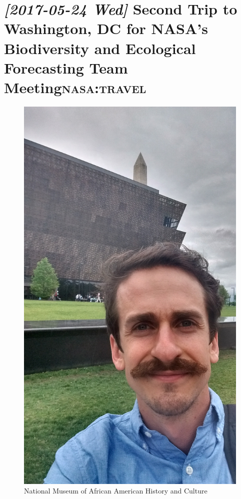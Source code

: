 \documentclass{article}
\begin{document}
\section*{\textit{[2017-05-24 Wed] } Second Trip to Washington, DC for NASA's Biodiversity and Ecological Forecasting Team Meeting\hfill{}\textsc{nasa:travel}}
\label{sec:org2332ca0}
\begin{figure}[htbp]
\centering
\includegraphics[width=.9\linewidth]{blog_imgs/DC_NASA_2017/NationalMuseumofAfricanAmericanHistoryandCulture_selfie.jpg}
\caption{National Museum of African American History and Culture}
\end{figure}
\end{document}
